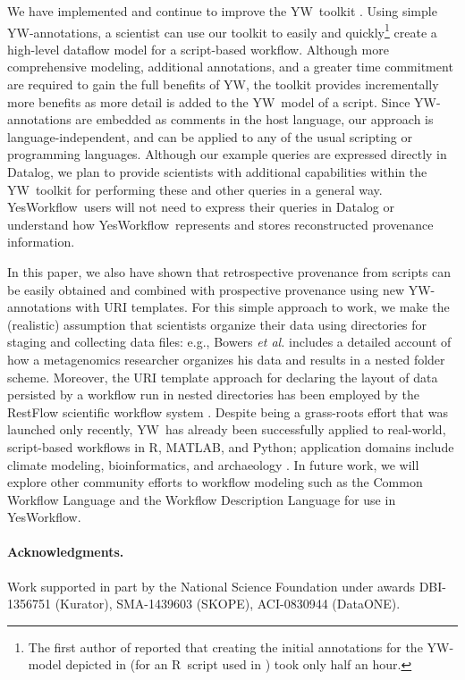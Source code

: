 \documentclass[letterpaper,twocolumn,10pt]{article}
\newcommand{\YW}{\textsf{YesWorkflow}}
\newcommand{\yw}{\textsf{YW}}
\newcommand{\R}{\textsf{R}}
\newcommand{\MATLAB}{\textsf{MATLAB}}
\begin{document}
We have implemented and continue to improve the
\yw\ toolkit \cite{mcphillips2015ywIJDC,yw-website}. Using simple
\yw-annotations, a scientist can use our toolkit to easily and
quickly\footnote{The first author of \cite{bocinsky2014} reported that
  creating the initial annotations for the \yw-model depicted in
  \cite{mcphillips2015ywIJDC} (for an \R\ script used in
  \cite{bocinsky2014}) took only half an hour.  }  create a high-level
dataflow model for a script-based workflow.  Although more comprehensive 
modeling, additional annotations, and a greater time commitment are required 
to gain the full benefits of \yw, the toolkit provides incrementally more benefits 
as more detail is added to the \yw\ model of a script.  Since \yw-annotations are
embedded as comments in the host language, our approach is
language-independent, and can be applied to any of the usual scripting
or programming languages.  Although our example queries are expressed
directly in Datalog, we plan to provide scientists with additional capabilities
within the \yw\ toolkit for performing these and other queries in a general
way.  \YW\ users will not need to express their queries in Datalog
or understand how \YW\ represents and stores reconstructed provenance
information.

In this paper, we also have shown that retrospective provenance from
scripts can be easily obtained and combined with prospective
provenance using new \yw-annotations with URI templates. For this
simple approach to work, we make the (realistic) assumption that
scientists organize their data using directories for staging and
collecting data files: e.g., Bowers \emph{et al.}
\cite{bowers2007project} includes a detailed account of how a
metagenomics researcher organizes his data and results in a nested
folder scheme. Moreover, the URI template approach for declaring the
layout of data persisted by a workflow run in nested directories has
been employed by the RestFlow scientific workflow system
\cite{tsai2013autodrug}.
Despite being a grass-roots effort that was launched only recently,
\yw\ has already been successfully applied to real-world, script-based
workflows in \R, \MATLAB, and Python; application domains include
climate modeling, bioinformatics, and archaeology
\cite{mcphillips2015ywIJDC}.
In future work, we will explore other community efforts to workflow
modeling such as the Common Workflow Language \cite{amstutz15CDL} and
the Workflow Description Language \cite{frazer15WDL} for use in \YW.

\paragraph{Acknowledgments.}
Work supported in part by the National Science Foundation under awards
DBI-1356751 (Kurator), SMA-1439603 (SKOPE), ACI-0830944 (DataONE).



\small

\end{document}
